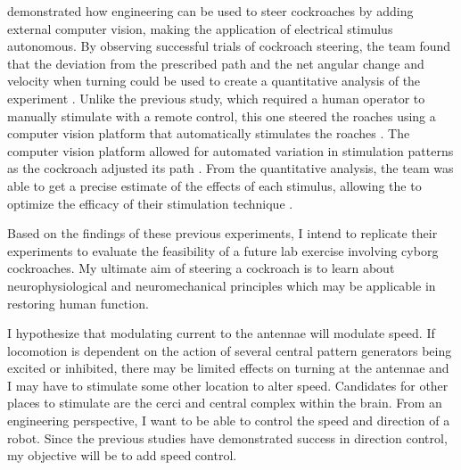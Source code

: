 \citet{whitmire2013kinect} demonstrated how engineering can be used to steer cockroaches by adding external computer vision, making the application of electrical stimulus autonomous. By observing successful trials of cockroach steering, the team found that the deviation from the prescribed path and the net angular change and velocity when turning could be used to create a quantitative analysis of the experiment \citep{whitmire2013kinect}. Unlike the previous study, which required a human operator to manually stimulate with a remote control, this one steered the roaches using a computer vision platform that automatically stimulates the roaches \citep{whitmire2013kinect}. The computer vision platform allowed for automated variation in stimulation patterns as the cockroach adjusted its path \citep{whitmire2013kinect}. From the quantitative analysis, the team was able to get a precise estimate of the effects of each stimulus, allowing the to optimize the efficacy of their stimulation technique \citep{whitmire2013kinect}. 



Based on the findings of these previous experiments, I intend to replicate their experiments to evaluate the feasibility of a future lab exercise involving cyborg cockroaches. My ultimate aim of steering a cockroach is to learn about neurophysiological and neuromechanical principles which may be applicable in restoring human function. 

I hypothesize that modulating current to the antennae will modulate speed. If locomotion is dependent on the action of several central pattern generators being excited or inhibited, there may be limited effects on turning at the antennae and I may have to stimulate some other location to alter speed. 
Candidates for other places to stimulate are the cerci and central complex within the brain. From an engineering perspective, I want to be able to control the speed and direction of a robot. Since the previous studies have demonstrated success in direction control, my objective will be to add speed control.







